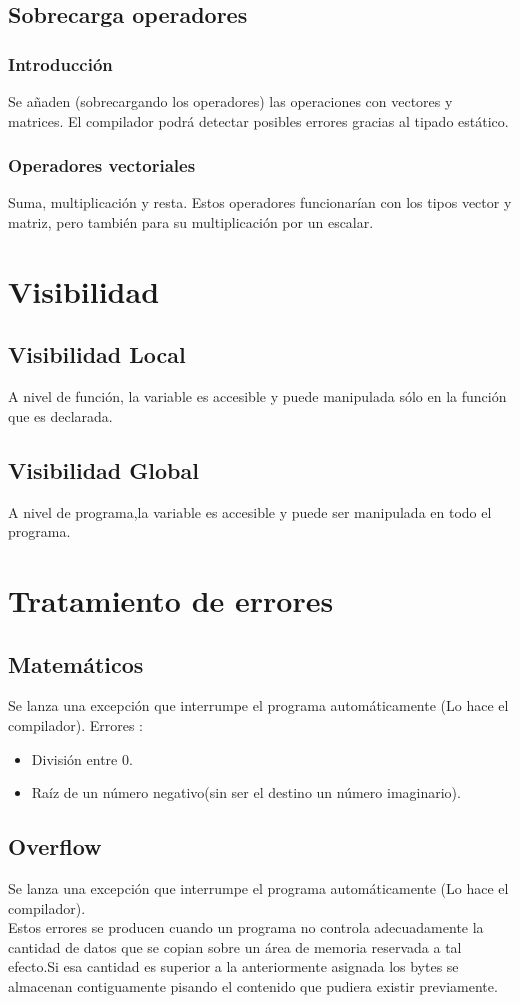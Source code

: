\documentclass[12pt,a4paper]{article}
\begin{document}
\subsection{Sobrecarga operadores}
\subsubsection{Introducción}
Se añaden (sobrecargando los operadores) las operaciones con vectores y
matrices. El compilador podrá detectar posibles errores gracias al tipado
estático.
\subsubsection{Operadores vectoriales}
Suma, multiplicación y resta. Estos operadores funcionarían con los tipos vector
y matriz, pero también para su multiplicación por un escalar.
\section{Visibilidad}
\subsection{Visibilidad Local}
A nivel de función, la variable es accesible y puede manipulada sólo en la
función que es declarada. 
\subsection{Visibilidad Global}
A nivel de programa,la variable es accesible y puede ser  manipulada en todo el
programa.
\section{Tratamiento de errores}
\subsection{Matemáticos}
Se lanza una excepción que interrumpe el programa automáticamente (Lo hace el
compilador).
Errores :
\begin{itemize}
\item División entre 0.
\item Raíz de un número negativo(sin ser el destino un número imaginario).
\end{itemize}
\subsection{Overflow}
Se lanza una excepción que interrumpe el programa automáticamente (Lo hace el
compilador).\\
Estos errores se  producen cuando  un programa no controla adecuadamente la cantidad de datos que se copian sobre un área de memoria reservada a tal efecto.Si esa cantidad es superior a la anteriormente asignada los bytes se almacenan contiguamente pisando el contenido que pudiera existir previamente.
\end{document}
